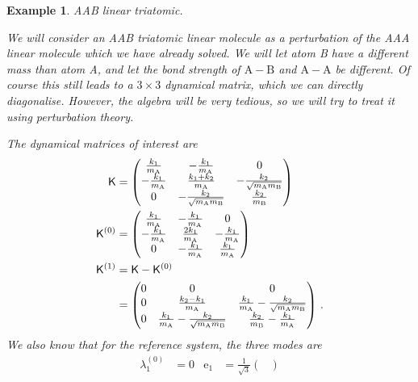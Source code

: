 \documentclass{article}
\theoremstyle{plain}\theoremheaderfont{\normalfont\itshape}\theorembodyfont{\rmfamily}\theoremseparator{.}\newtheorem*{rem}{Remark}\newtheorem*{ex}{Example}\newtheorem*{proof}{Proof}\newtheorem*{altp}{Alternative proof}
\theoremstyle{plain}\theoremheaderfont{\normalfont\bfseries}\theorembodyfont{\rmfamily}\theoremseparator{.}\newtheorem{thm}{Theorem}[section]\newtheorem{lem}[thm]{Lemma}\newtheorem{prop}[thm]{Proposition}\newtheorem*{cor}{Corollary}\newtheorem{defn}[thm]{Definition}\newtheorem{clm}[thm]{Claim}\newtheorem{clminproof}{Claim}
\theoremstyle{break}\theoremheaderfont{\normalfont\itshape}\theorembodyfont{\rmfamily}\theoremseparator{.\medskip}\newtheorem*{proofskip}{Proof}\newtheorem*{exs}{Examples}\newtheorem*{rems}{Remarks}
\theoremstyle{break}\theoremheaderfont{\normalfont\bfseries}\theorembodyfont{\rmfamily}\theoremseparator{.\medskip}\newtheorem{lemskip}[thm]{Lemma}\newtheorem{defnskip}[thm]{Definition}\newtheorem{propskip}[thm]{Proposition}\newtheorem{thmskip}[thm]{Theorem}
\numberwithin{equation}{section}
\newcommand{\vb}[1]{\bm{\mathrm{#1}}}
\renewcommand{\AA}{\mathrm{A}}
\newcommand{\BB}{\mathrm{B}}
\begin{document}
    \begin{ex}
        \textit{AAB linear triatomic.}

        We will consider an AAB triatomic linear molecule as a perturbation of the AAA linear molecule which we have already solved. We will let atom B have a different mass than atom A, and let the bond strength of \(\mathrm{A-B}\) and \(\mathrm{A-A}\) be different. Of course this still leads to a \(3\times 3\) dynamical matrix, which we can directly diagonalise. However, the algebra will be very tedious, so we will try to treat it using perturbation theory.
        
        The dynamical matrices of interest are
        \begin{align}
            \mathsf{K}&=\begin{pmatrix}
                \frac{k_1}{m_{\AA}} & -\frac{k_1}{m_{\AA}} & 0 \\
                -\frac{k_1}{m_{\AA}} & \frac{k_1+k_2}{m_{\AA}} & -\frac{k_2}{\sqrt{m_{\AA}m_{\BB}}}\\
                0 & -\frac{k_2}{\sqrt{m_{\AA}m_{\BB}}} & \frac{k_2}{m_{\BB}}
            \end{pmatrix}\\
            \mathsf{K}^{(0)}&=\begin{pmatrix}
                \frac{k_1}{m_{\AA}} & -\frac{k_1}{m_{\AA}} & 0 \\
                -\frac{k_1}{m_{\AA}} & \frac{2k_1}{m_{\AA}} & -\frac{k_1}{m_{\AA}} \\
                0 & -\frac{k_1}{m_{\AA}} & \frac{k_1}{m_{\AA}}
            \end{pmatrix}\\
            \mathsf{K}^{(1)}&=\mathsf{K}-\mathsf{K}^{(0)}\notag\\
            &=\begin{pmatrix}
                0 & 0 & 0 \\
                0 & \frac{k_2-k_1}{m_{\AA}} & \frac{k_1}{m_{\AA}}-\frac{k_2}{\sqrt{m_{\AA}m_{\BB}}} \\
                0 & \frac{k_1}{m_{\AA}}-\frac{k_2}{\sqrt{m_{\AA}m_{\BB}}} & \frac{k_2}{m_{\BB}}-\frac{k_1}{m_{\AA}}
            \end{pmatrix}\,.
        \end{align}
        We also know that for the reference system, the three modes are
        \begin{align}
            \lambda_1^{(0)}&=0 & \vb{e}_1&=\frac{1}{\sqrt{3}}\begin{pmatrix}

\end{pmatrix}
\end{align}
\end{ex}
\end{document}
